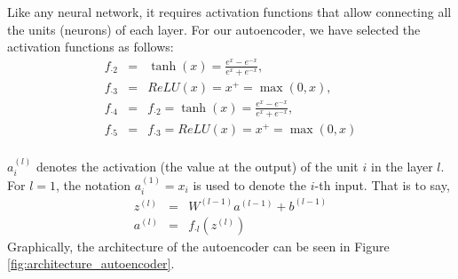 \documentclass{iosart2c}
\begin{document}
Like any neural network, it requires activation functions that allow connecting all the units (neurons) of each layer. For our autoencoder, we have selected the activation functions as follows:
\begin{eqnarray*}
f_{\cdot 2} &=& \tanh(x)=\frac{e^{x}-e^{-x}}{ e^{x}+e^{-x}},\\
f_{\cdot 3} &=& ReLU(x) = x^+ = \max(0, x),\\
f_{\cdot 4} &=& f_{\cdot 2} = \tanh(x)=\frac{e^{x}-e^{-x}}{ e^{x}+e^{-x}},\\
f_{\cdot 5} &=& f_{\cdot 3} = ReLU(x) = x^+ = \max(0, x)\\
\end{eqnarray*}

$a_i^{(l)}$ denotes the activation (the value at the output) of the unit $i$ in the layer $l$. For $l=1$, the notation $a_i^{(1)}=x_i$ is used to denote the $i$-th input. That is to say,
\begin{eqnarray*}
z^{(l)}&=&W^{(l-1)}a^{(l-1)}+b^{(l-1)}\\
a^{(l)}&=&f_{\cdot l}(z^{(l)})
\end{eqnarray*}
Graphically, the architecture of the autoencoder can be seen in Figure \ref{fig:architecture_autoencoder}.
\end{document}
